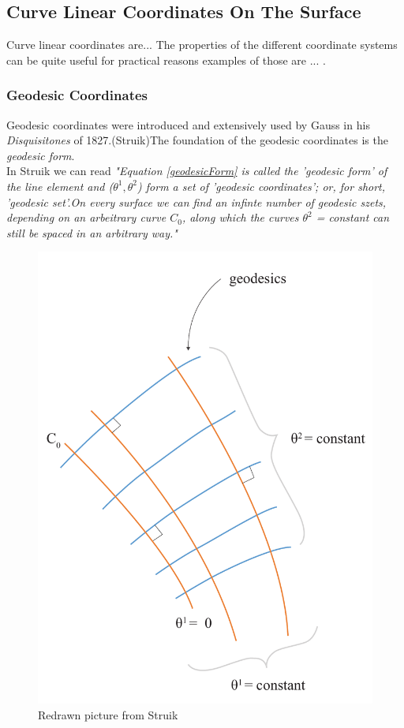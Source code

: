 \subsection{Curve Linear Coordinates On The Surface}

Curve linear coordinates are... The properties of the different coordinate systems can be quite useful for practical reasons examples of those are ... .  

\subsubsection{Geodesic Coordinates}

Geodesic coordinates were introduced and extensively used by Gauss in his \textit{Disquisitones} of 1827.(Struik)The foundation of the geodesic coordinates is the  \textit{geodesic form}.\\ 
In Struik we can read \textit{"Equation \ref{geodesicForm} is called the 'geodesic form' of the line element and ($\theta^1,\theta^2$) form a set of 'geodesic coordinates'; or, for short, 'geodesic set'.On every surface we can find an infinte number of geodesic szets, depending on an arbeitrary curve $C_0$, along which the curves $\theta^2$ = constant can still be spaced in an arbitrary way."}\\

\begin{figure}[H]
\centering
\includegraphics[height=0.8\linewidth ]{figure/Theory/geodesicCoordRe.pdf}
\caption{Redrawn picture from Struik }
\end{figure}



